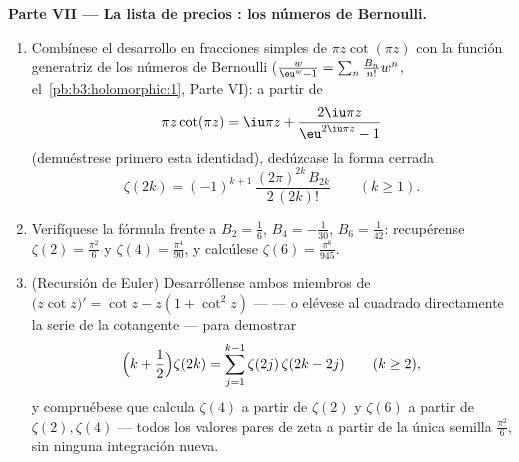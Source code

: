 \begin{problem}
\begin{enumerate}[resume]
\end{enumerate}
\medskip
\noindent\textbf{Parte VII --- La lista de precios : los números
de Bernoulli.}
\begin{enumerate}[resume]
  \item Combínese el desarrollo en fracciones simples de $\pi
        z\cot(\pi z)$ con la función generatriz de los números de
  Bernoulli ($\frac{w}{\eu^w - 1} =
        \sum_n\frac{B_n}{n!}w^n$, el~\cref{pb:b3:holomorphic:1}, Parte
  VI): a partir de
        \[
        \pi z\cot(\pi z) = \iu\pi z +
        \frac{2\iu\pi z}{\eu^{2\iu\pi z} - 1}
        \]
        (demuéstrese primero esta identidad), dedúzcase la forma cerrada
        \[
        \zeta(2k) = (-1)^{k+1}\,
        \frac{(2\pi)^{2k}\,B_{2k}}{2\,(2k)!}
        \qquad (k \geq 1).
        \]
  \item Verifíquese la fórmula frente a $B_2 = \frac16$, $B_4 =
        -\frac1{30}$, $B_6 = \frac1{42}$: recupérense $\zeta(2) =
        \frac{\pi^2}6$ y $\zeta(4) = \frac{\pi^4}{90}$, y calcúlese
  $\zeta(6) = \frac{\pi^6}{945}$. \item (Recursión de Euler)
  Desarróllense ambos miembros de
        $\bigl(z\cot z\bigr)' = \cot z - z(1 + \cot^2z)$ ---
        --- o elévese al cuadrado directamente la serie de la cotangente
        --- para demostrar
        \[
        \Bigl(k + \frac12\Bigr)\zeta(2k) =
        \sum_{j=1}^{k-1}\zeta(2j)\,\zeta(2k - 2j)
        \qquad (k \geq 2),
        \]
        y compruébese que calcula $\zeta(4)$ a partir de $\zeta(2)$ y
        $\zeta(6)$ a partir de $\zeta(2), \zeta(4)$ --- todos los
        valores pares de zeta a partir de la única semilla
        $\frac{\pi^2}6$, sin ninguna integración nueva.
\end{enumerate}
\end{problem}
